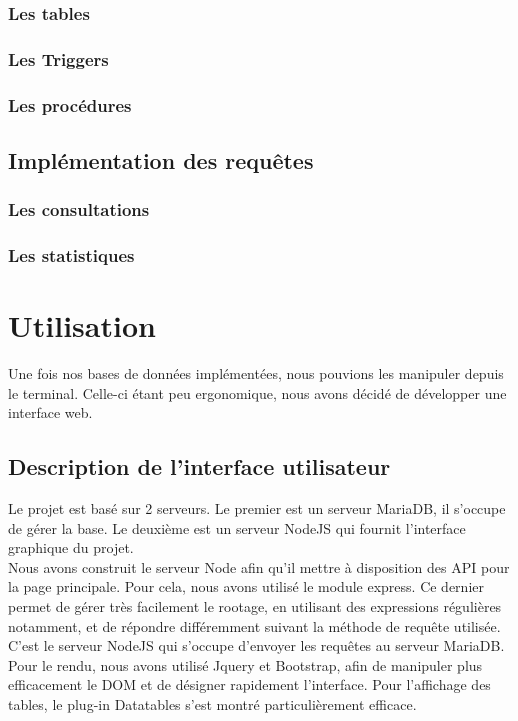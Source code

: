\documentclass[10pt]{article}
\begin{document}
  \subsubsection{Les tables}
  \subsubsection{Les Triggers}
  \subsubsection{Les procédures}
  
  \subsection{Implémentation des requêtes}\label{subsec:requete}
  \subsubsection{Les consultations}
  \subsubsection{Les statistiques}
  
  \section{Utilisation}\label{sec:utili}
  
  Une fois nos bases de données implémentées, nous pouvions les manipuler depuis le terminal. Celle-ci étant peu ergonomique, nous avons décidé de développer une interface web.
  
  \subsection{Description de l'interface utilisateur}\label{subsec:desc}
  
  Le projet est basé sur 2 serveurs. Le premier est un serveur MariaDB, il s'occupe de gérer la base. Le deuxième est un serveur NodeJS qui fournit l'interface graphique du projet. \\
 
  Nous avons construit le serveur Node afin qu'il mettre à disposition des API pour la page principale. Pour cela, nous avons utilisé le module express. Ce dernier permet de gérer très facilement le rootage, en utilisant des expressions régulières notamment, et de répondre différemment suivant la méthode de requête utilisée. C'est le serveur NodeJS qui s'occupe d'envoyer les requêtes au serveur MariaDB.
  Pour le rendu, nous avons utilisé Jquery et Bootstrap, afin de manipuler plus efficacement le DOM et de désigner rapidement l'interface. Pour l'affichage des tables, le plug-in Datatables s'est montré particulièrement efficace. \\
  
\end{document}
